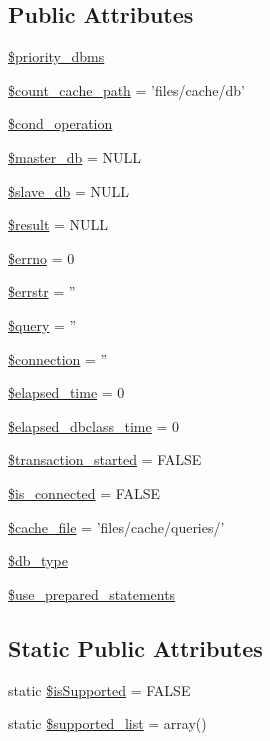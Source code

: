 \subsection*{Public Attributes}
\begin{DoxyCompactItemize}
\item 
\hyperlink{classDB_a082292b9ca3855cbddd3a74e9490ca82}{\$priority\-\_\-dbms}
\item 
\hyperlink{classDB_aca72b9b3a39bb5e5d2e444f20db2c6bb}{\$count\-\_\-cache\-\_\-path} = 'files/cache/db'
\item 
\hyperlink{classDB_a85f8f65c37474b0e65d844e1f01f39b0}{\$cond\-\_\-operation}
\item 
\hyperlink{classDB_ad0a3ae175a659516131cfc6cd615d15c}{\$master\-\_\-db} = N\-U\-L\-L
\item 
\hyperlink{classDB_a0a811a4446882ee9edf0ed846e8926f3}{\$slave\-\_\-db} = N\-U\-L\-L
\item 
\hyperlink{classDB_a74e74ee9d3311aa1e8107b8accd05e29}{\$result} = N\-U\-L\-L
\item 
\hyperlink{classDB_af99d759f7fb3bbadd579d72e686d1cf1}{\$errno} = 0
\item 
\hyperlink{classDB_ae006f35821aba99713b834fa6a69e55b}{\$errstr} = ''
\item 
\hyperlink{classDB_a32ebabea908efd805a83db48fec3ab52}{\$query} = ''
\item 
\hyperlink{classDB_ac9071e31f8241ad644430537f39a16ce}{\$connection} = ''
\item 
\hyperlink{classDB_af5a3fdd4e0078a185dac8c2727fb4f2c}{\$elapsed\-\_\-time} = 0
\item 
\hyperlink{classDB_a0483c1bfe18fa5e8bbe7915f9c8187a7}{\$elapsed\-\_\-dbclass\-\_\-time} = 0
\item 
\hyperlink{classDB_a39a0eef56f82082ca4c69bcad1f12a31}{\$transaction\-\_\-started} = F\-A\-L\-S\-E
\item 
\hyperlink{classDB_aac22b6ebcd8f78c2f70646d381f933dc}{\$is\-\_\-connected} = F\-A\-L\-S\-E
\item 
\hyperlink{classDB_a9952a27cbf07942e5bb8853ab95b5bdb}{\$cache\-\_\-file} = 'files/cache/queries/'
\item 
\hyperlink{classDB_a78868b4c2301aa813d9e2d481424f1e8}{\$db\-\_\-type}
\item 
\hyperlink{classDB_a9902aee7d8900a597670fce92c7eb74b}{\$use\-\_\-prepared\-\_\-statements}
\end{DoxyCompactItemize}
\subsection*{Static Public Attributes}
\begin{DoxyCompactItemize}
\item 
static \hyperlink{classDB_a6b693edbdcdce5c86f42c050f62d8136}{\$is\-Supported} = F\-A\-L\-S\-E
\item 
static \hyperlink{classDB_ac09dd547a22963632e063c9ab68b7707}{\$supported\-\_\-list} = array()
\end{DoxyCompactItemize}


